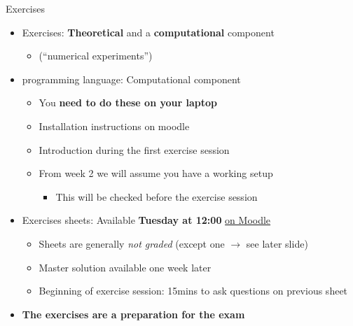 \begin{frame}{Exercises}
    \begin{itemize}
        \item Exercises: \textbf{Theoretical}
            and a \textbf{computational} component
            \begin{itemize}
                \vspace{-0.3em}
                \item \textcolor{grey5}{(``numerical experiments'')}
            \end{itemize}
        \vspace{0.5em}
        \item \julia programming language: Computational component
            \begin{itemize}
                \vspace{-0.2em}
                \item You \textbf{need to do these on your laptop}
                \vspace{-0.2em}
                \item Installation instructions on moodle
                \vspace{-0.2em}
                \item Introduction during the first exercise session
                \vspace{-0.2em}
                \item \alert{From week 2} we will assume you have a working setup
                    \begin{itemize}
                        \vspace{-0.3em}
                        \item \textcolor{grey5}{This will be checked before the exercise session}
                    \end{itemize}
            \end{itemize}
            \vspace{0.7em}
        \item Exercises sheets: Available \textbf{Tuesday at 12:00}
            \alert{\href{https://go.epfl.ch/numerical-analysis}{on Moodle}}
            \begin{itemize}
                \vspace{-0.2em}
                \item Sheets are generally \textit{not graded}
                    \textcolor{grey5}{(except one $\rightarrow$ see later slide)}
                \vspace{-0.2em}
                \item Master solution available one week later
                \vspace{-0.2em}
                \item Beginning of exercise session:
                    \alert{15mins} to ask questions on previous sheet
            \end{itemize}
            \vspace{0.7em}
        \item \textbf{The exercises are a preparation for the exam}
    \end{itemize}
\end{frame}

